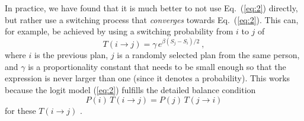 In practice, we have found that it is much better to not use
Eq.~(\ref{eq:2}) directly, but rather use a switching process that
\emph{converges} towards Eq.~(\ref{eq:2}).  
This can, for example, be
achieved by using a switching probability from $i$ to $j$ of
\begin{equation}
T(i \to j) = \gamma \,  e^{\beta ( S_j - S_i )/2} \ ,
\label{eq:3}
\end{equation}
where $i$ is the previous plan, $j$ is a randomly selected plan from
the same person, and $\gamma$ is a proportionality constant that needs
to be small enough so that the expression is never larger than one
(since it denotes a probability).  This works because the logit model
(\ref{eq:2})
fulfills the detailed balance condition
\begin{equation}
P(i) \, T(i \to j) = P(j) \, T(j \to i) 
\label{eq:detailed-balance}
\end{equation}
for these $T(i \to j)$ \citep[e.g.,][]{ross-2006}.%
